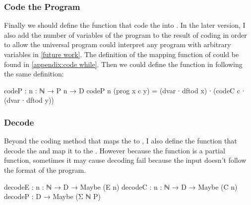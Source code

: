 \subsubsection{Code the Program}
Finally we should define the function that code the  into .
In the later version, I also add the number of variables of the program to the result of coding in order to allow the universal \WHILE program could interpret any \WHILE program with arbitrary variables in \ref{future work}.
The definition of the mapping function of  could be found in \ref{appendix:code while}.
Then we could define the function in \Agda following the same definition:
\begin{code}
codeP : {n : ℕ} → P n → D
codeP {n} (prog x c y) = (dvar ∙ dftod x) ∙
                         (codeC c ∙
                         (dvar ∙ dftod y))
\end{code}
\subsubsection{Decode}
Beyond the coding method that maps the  to , I also define the function that decode the  and map it to the .
However because the function  is a partial function, sometimes it may cause decoding fail because the input  doesn't follow the format of the program.
\begin{code}
decodeE : {n : ℕ} → D → Maybe (E n)
decodeC : {n : ℕ} → D → Maybe (C n)
decodeP : D → Maybe (Σ ℕ P)
\end{code}
